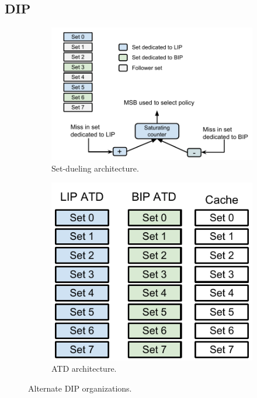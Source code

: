 \subsection{DIP}
\label{sec:algorithms:dip}

\begin{figure}
    \centering
    \begin{subfigure}[b]{0.50\textwidth}
        \includegraphics[width=\textwidth]{figures/algorithms/DIP_architecture}
        \caption{Set-dueling architecture.}
        \label{fig:algorithms:dip:set_dueling}
    \end{subfigure}    
    \begin{subfigure}[b]{0.45\textwidth}
        \includegraphics[width=.9\textwidth]{figures/algorithms/DIP_atd_architecture}
        \caption{ATD architecture.}
        \label{fig:algorithms:dip:atd}
    \end{subfigure}
    \caption{Alternate DIP organizations.}
\end{figure}

